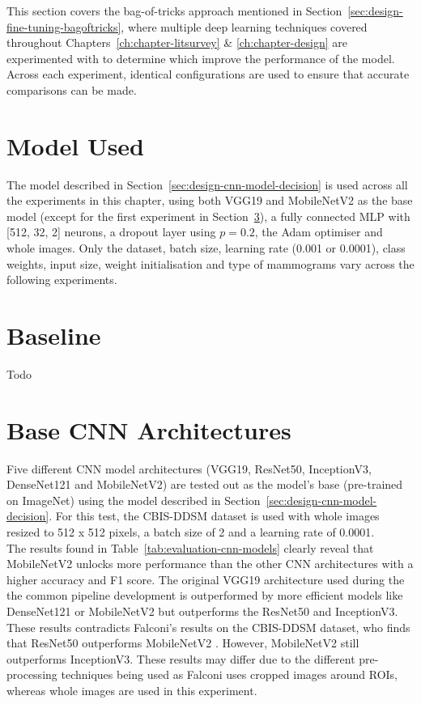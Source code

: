 This section covers the bag-of-tricks approach mentioned in Section~\ref{sec:design-fine-tuning-bagoftricks}, where multiple deep learning techniques covered throughout Chapters~\ref{ch:chapter-litsurvey} \& \ref{ch:chapter-design} are experimented with to determine which improve the performance of the model. Across each experiment, identical configurations are used to ensure that accurate comparisons can be made.


\section{Model Used}

The model described in Section~\ref{sec:design-cnn-model-decision} is used across all the experiments in this chapter, using both VGG19 and MobileNetV2 as the base model (except for the first experiment in Section~\ref{sec:evaluation-cnn-model-experiment}), a fully connected MLP with [512, 32, 2] neurons, a dropout layer using $p=0.2$, the Adam optimiser and whole images. Only the dataset, batch size, learning rate (0.001 or 0.0001), class weights, input size, weight initialisation and type of mammograms vary across the following experiments.


\section{Baseline}

Todo


\section{Base CNN Architectures}
\label{sec:evaluation-cnn-model-experiment}

Five different CNN model architectures (VGG19, ResNet50, InceptionV3, DenseNet121 and MobileNetV2) are tested out as the model's base (pre-trained on ImageNet) using the model described in Section~\ref{sec:design-cnn-model-decision}. For this test, the CBIS-DDSM dataset is used with whole images resized to 512 x 512 pixels, a batch size of 2 and a learning rate of 0.0001.\\

The results found in Table~\ref{tab:evaluation-cnn-models} clearly reveal that MobileNetV2 unlocks more performance than the other CNN architectures with a higher accuracy and F1 score. The original VGG19 architecture used during the the common pipeline development is outperformed by more efficient models like DenseNet121 or MobileNetV2 but outperforms the ResNet50 and InceptionV3. These results contradicts Falconi's results on the CBIS-DDSM dataset, who finds that ResNet50 outperforms MobileNetV2 \citep{Falconi2019}. However, MobileNetV2 still outperforms InceptionV3. These results may differ due to the different pre-processing techniques being used as Falconi uses cropped images around ROIs, whereas whole images are  used in  this experiment.\\

